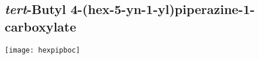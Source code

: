 
\subsection{\textit{tert}-Butyl 4-(hex-5-yn-1-yl)piperazine-1-carboxylate }


\begin{scheme}[H]
	\begin{center}
		\texttt{[image: hexpipboc]}
	\end{center}
\end{scheme}


